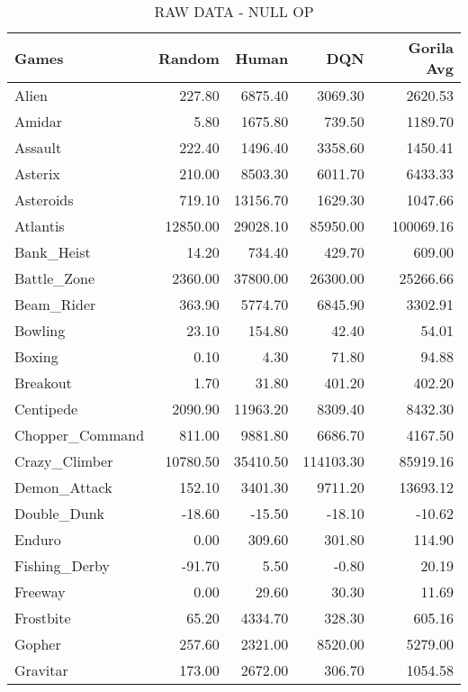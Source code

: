 \begin{table*}[h]
	\vskip  0.5in
	\caption{RAW DATA - NULL OP}
	\centering 
	\begin{tabular}{l|r|r|r|r}
		\hline \hline
		Games & Random & Human & DQN & Gorila Avg \\
		\hline
		Alien & 227.80 & 6875.40 & 3069.30 & 2620.53 \\
		\hline
		Amidar & 5.80 & 1675.80 & 739.50 & 1189.70 \\
		\hline
		Assault & 222.40 & 1496.40 & 3358.60 & 1450.41 \\
		\hline
		Asterix & 210.00 & 8503.30 & 6011.70 & 6433.33 \\
		\hline
		Asteroids & 719.10 & 13156.70 & 1629.30 & 1047.66 \\
		\hline
		Atlantis & 12850.00 & 29028.10 & 85950.00 & 100069.16 \\
		\hline
		Bank\_Heist & 14.20 & 734.40 & 429.70 & 609.00 \\
		\hline
		Battle\_Zone & 2360.00 & 37800.00 & 26300.00 & 25266.66 \\
		\hline
		Beam\_Rider & 363.90 & 5774.70 & 6845.90 & 3302.91 \\
		\hline
		Bowling & 23.10 & 154.80 & 42.40 & 54.01 \\
		\hline
		Boxing & 0.10 & 4.30 & 71.80 & 94.88 \\
		\hline
		Breakout & 1.70 & 31.80 & 401.20 & 402.20 \\
		\hline
		Centipede & 2090.90 & 11963.20 & 8309.40 & 8432.30 \\
		\hline
		Chopper\_Command & 811.00 & 9881.80 & 6686.70 & 4167.50 \\
		\hline
		Crazy\_Climber & 10780.50 & 35410.50 & 114103.30 & 85919.16 \\
		\hline
		Demon\_Attack & 152.10 & 3401.30 & 9711.20 & 13693.12 \\
		\hline
		Double\_Dunk & -18.60 & -15.50 & -18.10 & -10.62 \\
		\hline
		Enduro & 0.00 & 309.60 & 301.80 & 114.90 \\
		\hline
		Fishing\_Derby & -91.70 & 5.50 & -0.80 & 20.19 \\
		\hline
		Freeway & 0.00 & 29.60 & 30.30 & 11.69 \\
		\hline
		Frostbite & 65.20 & 4334.70 & 328.30 & 605.16 \\
		\hline
		Gopher & 257.60 & 2321.00 & 8520.00 & 5279.00 \\
		\hline
		Gravitar & 173.00 & 2672.00 & 306.70 & 1054.58 \\

\end{tabular}
\end{table*}
